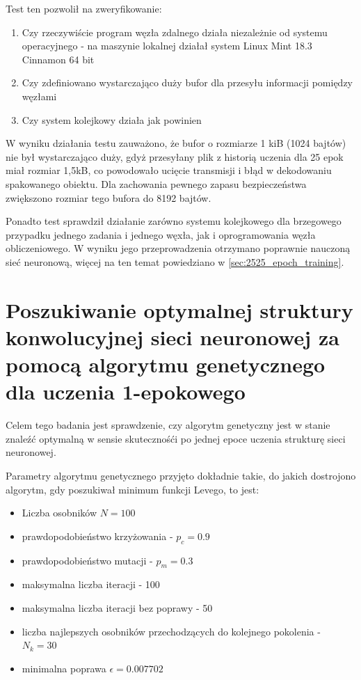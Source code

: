 Test ten pozwolił na zweryfikowanie:
\begin{enumerate}
  \item Czy rzeczywiście program węzła zdalnego działa niezależnie od systemu operacyjnego - na maszynie lokalnej działał system Linux Mint 18.3 Cinnamon 64 bit
  \item Czy zdefiniowano wystarczająco duży bufor dla przesyłu informacji pomiędzy węzłami
  \item Czy system kolejkowy działa jak powinien
\end{enumerate}

W wyniku działania testu zauważono, że bufor o rozmiarze 1 kiB (1024 bajtów) nie był wystarczająco duży, gdyż przesyłany plik z historią uczenia dla 25 epok miał rozmiar 1,5kB, co powodowało ucięcie transmisji i błąd w dekodowaniu spakowanego obiektu.
Dla zachowania pewnego zapasu bezpieczeństwa zwiększono rozmiar tego bufora do 8192 bajtów.

Ponadto test sprawdził działanie zarówno systemu kolejkowego dla brzegowego przypadku jednego zadania i jednego węxła, jak i oprogramowania węzła obliczeniowego.
W wyniku jego przeprowadzenia otrzymano poprawnie nauczoną sieć neuronową, więcej na ten temat powiedziano w \ref{sec:2525_epoch_training}.

\section{Poszukiwanie optymalnej struktury konwolucyjnej sieci neuronowej za pomocą algorytmu genetycznego dla uczenia 1-epokowego}\label{sec:actual_experiment}
Celem tego badania jest sprawdzenie, czy algorytm genetyczny jest w stanie znaleźć optymalną w sensie skutecznośći po jednej epoce uczenia strukturę sieci neuronowej.

Parametry algorytmu genetycznego przyjęto dokładnie takie, do jakich dostrojono algorytm, gdy poszukiwał minimum funkcji Levego, to jest:
\begin{itemize}
  \item Liczba osobników $N = 100$
  \item prawdopodobieństwo krzyżowania - $p_{c} = 0.9$
  \item prawdopodobieństwo mutacji - $p_{m} = 0.3$
  \item maksymalna liczba iteracji - 100
  \item maksymalna liczba iteracji bez poprawy - 50
  \item liczba najlepszych osobników przechodzących do kolejnego pokolenia - $ N_{k} = 30$
  \item minimalna poprawa $\epsilon = 0.007702$
\end{itemize}

